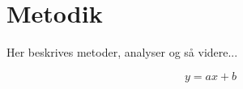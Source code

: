 \chapter{Metodik}\label{ch:metodik}
Her beskrives metoder, analyser og så videre...

\begin{equation}
    y = ax + b
  \label{eq:Bsp_OhmsLaw}
\end{equation}


